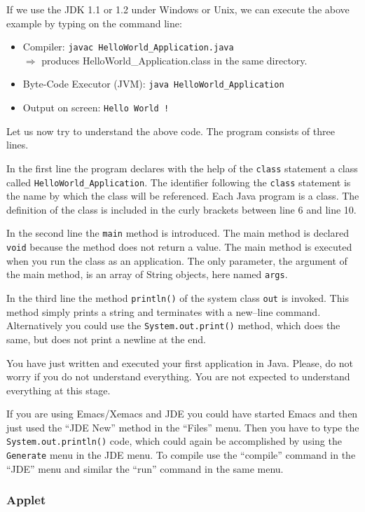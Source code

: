 If we use the JDK 1.1 or 1.2 under Windows or Unix, we can execute
the above example by typing on the command line:
\begin{itemize}
\item Compiler: \verb/javac HelloWorld_Application.java/  \\
  $\Longrightarrow$ produces HelloWorld\_Application.class 
  in the same directory.
\item Byte-Code Executor (JVM):  \verb/java HelloWorld_Application/
\item Output on screen: \verb|Hello World !|
\end{itemize}
Let us now try to understand the above code. The program consists of
three lines. 

In the first line the program declares 
with the help of the \texttt{class} statement a class called 
\verb|HelloWorld_Application|. 
The identifier following the \texttt{class} statement is
the name by which the class will be referenced. Each Java program
is a class. The definition of the class is included in the curly brackets
between line 6 and line 10.

In the second line the \verb|main| method is introduced. The main
method is declared \verb|void| because the method does not return a
value. The main method is executed when you run the class as an
application. The only parameter, the argument
of the main method, is an array of String objects, here named \verb|args|.

In the third line the method \verb|println()| of the system class 
\verb|out|
is invoked. This method simply prints a string and terminates with a 
new--line command. Alternatively you could use the 
\verb|System.out.print()| method, which does the same, but does
not print a newline at the end. 

You have just written and executed your first application in
Java. Please, do not worry if you do not understand everything. You are
not expected to understand everything at this stage.

If you are using Emacs/Xemacs and JDE you could have started Emacs and
then just used the ``JDE New'' method in the ``Files'' menu. Then you
have to type the \verb|System.out.println()| code, which could
again be accomplished by using the \verb|Generate| menu in the
JDE menu. To compile
use the ``compile'' command in the ``JDE'' menu and similar
the ``run'' command in the same menu.  

\subsubsection{Applet}
\label{sec:Applet}

